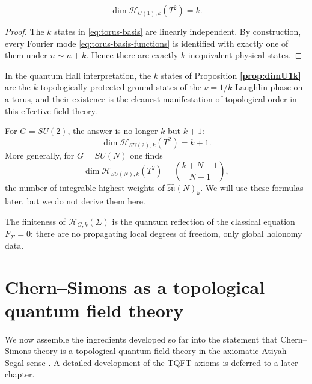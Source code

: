 \documentclass[11pt]{article}
\theoremstyle{definition}
\numberwithin{theorem}{section}
\numberwithin{equation}{section}
\begin{document}
\begin{proposition}\label{prop:dimU1k}
\begin{equation}
\dim \mathcal{H}_{U(1),k}(T^2) = k.
\end{equation}
\end{proposition}

\begin{proof}
The $k$ states in \eqref{eq:torus-basis} are linearly independent. By construction, every Fourier mode \eqref{eq:torus-basis-functions} is identified with exactly one of them under $n\sim n+k$. Hence there are exactly $k$ inequivalent physical states.
\end{proof}

\noindent In the quantum Hall interpretation, the $k$ states of Proposition \textbf{\ref{prop:dimU1k}} are the $k$ topologically protected ground states of the $\nu = 1/k$ Laughlin phase on a torus, and their existence is the cleanest manifestation of topological order in this effective field theory.

\begin{example}\label{ex:SU2-torus}
For $G = SU(2)$, the answer is no longer $k$ but $k+1$:
\begin{equation*}
\dim \mathcal{H}_{SU(2),k}(T^2) = k+1.
\end{equation*}
More generally, for $G = SU(N)$ one finds
\begin{equation*}
\dim \mathcal{H}_{SU(N),k}(T^2) = \binom{k+N-1}{N-1},
\end{equation*}
the number of integrable highest weights of $\widehat{\mathfrak{su}}(N)_k$. We will use these formulas later, but we do not derive them here.
\end{example}

\medskip

\noindent The finiteness of $\mathcal{H}_{G,k}(\Sigma)$ is the quantum reflection of the classical equation $F_\Sigma=0$: there are no propagating local degrees of freedom, only global holonomy data.

\section{Chern--Simons as a topological quantum field theory}\label{sec:TQFT}

We now assemble the ingredients developed so far into the statement that Chern--Simons theory is a topological quantum field theory in the axiomatic Atiyah--Segal sense \cite{Atiyah1988TQFT}. A detailed development of the TQFT axioms is deferred to a later chapter.
\end{document}
